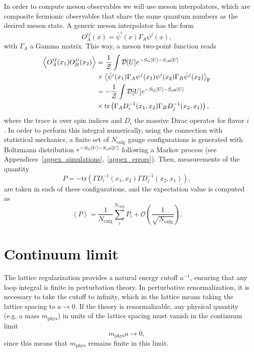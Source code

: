 In order to compute meson observables we will use meson interpolators, which are composite fermionic observables that share the same quantum numbers as the desired meson state. A generic meson interpolator has the form
\begin{equation}
{O}_A^{ij}(x)=\bar{\psi}^i(x)\Gamma_A\psi^j(x),
\end{equation}	
with $\Gamma_A$ a Gamma matrix. This way, a meson two-point function reads
\begin{align}
\label{ch_foundation:eq:path_int}
\left<{O}_A^{ij}(x_1){O}_B^{ji}(x_2)\right>&=\frac{1}{\mathcal{Z}}\int\mathcal{D}[U]e^{-S_{\textrm G}[U]-S_{\textrm{eff}}[U]}\notag\\
&\times\left<\bar{\psi}^i(x_1)\Gamma_A\psi^j(x_1)\psi^i(x_2)\Gamma_B\bar{\psi}^j(x_2)\right>_{\textrm F}  \\
&=-\frac{1}{\mathcal{Z}}\int\mathcal{D}[U]e^{-S_{\textrm G}[U]-S_{\textrm{eff}}[U]}\notag\\
&\times{\textrm{tr}}\left(\Gamma_AD_i^{-1}(x_1,x_2)\Gamma_BD_j^{-1}(x_2,x_1)\right),
\end{align}
where the trace is over spin indices and $D_i$ the massive Dirac operator for flavor $i$. In order to perform this integral numerically, using the connection with statistical mechanics, a finite set of $N_{\textrm{cnfg}}$ gauge configurations is generated with Boltzmann distribution $e^{-S_{\textrm G}[U]-S_{\textrm{eff}}[U]}$ following a Markov process (see Appendices~\ref{appex_simulations},~\ref{appex_errors}). Then, measurements of the quantity
\begin{equation}
P=-{\textrm{tr}}\left(\Gamma D_i^{-1}(x_1,x_2)\Gamma D_j^{-1}(x_2,x_1)\right),
\end{equation}
are taken in each of these configurations, and the expectation value is computed as
\begin{equation}
\left<P\right>=\frac{1}{N_{\textrm{cnfg}}}\sum_{i}^{N_{\textrm{cnfg}}}P_i+\mathcal{O}\left(\frac{1}{\sqrt{N_{\textrm{cnfg}}}}\right).
\end{equation}



\section{Continuum limit}
\label{ch_foundation:sec:continuum-limit}

The lattice regularization provides a natural energy cutoff $a^{-1}$, ensuring that any loop integral is finite in perturbation theory. In perturbative renormalization, it is necessary to take the cutoff to infinity, which in the lattice means taking the lattice spacing to $a\rightarrow0$. If the theory is renormalizable, any physical quantity (e.g. a mass $m_{\textrm{phys}}$) in units of the lattice spacing must vanish in the continuum limit
\begin{equation}
\label{ch_foundation:eq:ma0}
m_{\textrm{phys}}a\rightarrow0,
\end{equation}
since this means that $m_{\textrm{phys}}$ remains finite in this limit. 

